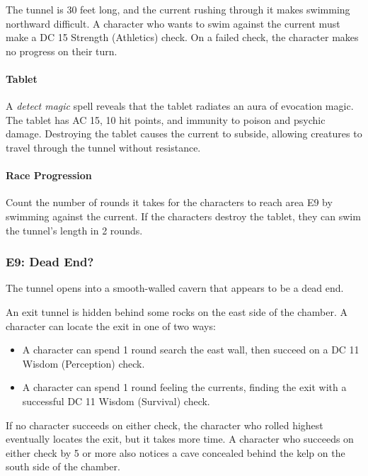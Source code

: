 \documentclass[letterpaper, 11pt, bg=full, twocolumn]{dndbook}
\begin{document}
The tunnel is 30 feet long, and the current rushing through it makes swimming northward difficult. A character who wants to swim against the current must make a DC 15 Strength (Athletics) check. On a failed check, the character makes no progress on their turn.

\paragraph{Tablet}

A \textit{detect magic} spell reveals that the tablet radiates an aura of evocation magic. The tablet has AC 15, 10 hit points, and immunity to poison and psychic damage. Destroying the tablet causes the current to subside, allowing creatures to travel through the tunnel without resistance.

\paragraph{Race Progression}

Count the number of rounds it takes for the characters to reach area E9 by swimming against the current. If the characters destroy the tablet, they can swim the tunnel's length in 2 rounds.

\subsubsection{E9: Dead End?}

\begin{DndReadAloud}
The tunnel opens into a smooth-walled cavern that appears to be a dead end.
\end{DndReadAloud}

An exit tunnel is hidden behind some rocks on the east side of the chamber. A character can locate the exit in one of two ways:

\begin{itemize}
\item A character can spend 1 round search the east wall, then succeed on a DC 11 Wisdom (Perception) check.
\item A character can spend 1 round feeling the currents, finding the exit with a successful DC 11 Wisdom (Survival) check.
\end{itemize}

If no character succeeds on either check, the character who rolled highest eventually locates the exit, but it takes more time. A character who succeeds on either check by 5 or more also notices a cave concealed behind the kelp on the south side of the chamber.
\end{document}
